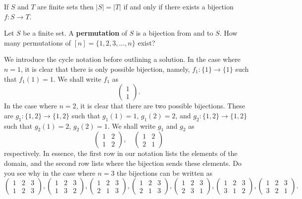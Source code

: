\begin{theorem}
If $S$ and $T$ are finite sets then $|S|=|T|$ if and only if there exists a bijection $f:S\to T$.
\end{theorem}
\begin{question}
Let $S$ be a finite set. A \textbf{permutation} of $S$ is a bijection from and to $S$. How many permutations of $[n]=\{1,2,3,\ldots,n\}$ exist?
\end{question}
We introduce the cycle notation before outlining a solution. In the case where $n=1$, it is clear that there is only possible bijection, namely, $f_1:\{1\}\to\{1\}$ such that $f_1 \left(1 \right) =1$. We shall write $f_1$ as \[
\begin{pmatrix}
	1 \\ 1
\end{pmatrix}
.\] In the case where $n=2$, it is clear that there are two possible bijections. These are $g_1:\{1,2\}\to \{1,2\}$ such that $g_1\left(1 \right) =1$, $g_1\left( 2 \right)=2$, and $g_{2}:\{1,2\}\to\{1,2\}$ such that $g_{2}\left(1  \right) =2$, $g_{2}\left( 2 \right) =1$. We shall write $g_{1}$ and $g_{2}$ as \[
\begin{pmatrix} 1 & 2 \\ 1 & 2 \end{pmatrix}, \quad \begin{pmatrix} 1 & 2 \\ 2 & 1 \end{pmatrix} 
\] respectively. In essence, the first row in our notation lists the elements of the domain, and the second row lists where the bijection sends these elements. Do you see why in the case where $n=3$ the bijections can be written as 
 \[
	 \begin{pmatrix} 1 & 2 & 3 \\ 1 & 2 & 3 \end{pmatrix}, \begin{pmatrix} 1 & 2 & 3 \\ 1 & 3 & 2 \end{pmatrix}, \begin{pmatrix} 1 & 2 & 3 \\ 2 & 1 & 3 \end{pmatrix}, \begin{pmatrix} 1 & 2 & 3 \\ 2 & 1 & 3 \end{pmatrix}, \begin{pmatrix} 1 & 2 & 3 \\ 2 & 3 & 1 \end{pmatrix}, \begin{pmatrix} 1 & 2 & 3 \\ 3 & 1 & 2\end{pmatrix}, \begin{pmatrix} 1 & 2 & 3 \\ 3 & 2 & 1 \end{pmatrix} 
.\]
